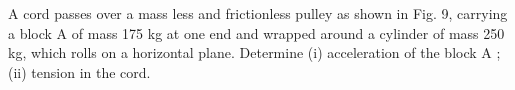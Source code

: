   \Or

\item A cord passes over a mass less and frictionless pulley as shown in Fig. 9, carrying a block A of
  mass 175 kg at one end and wrapped around a cylinder of mass 250 kg, which rolls on a horizontal
  plane. Determine (i) acceleration of the block A ; (ii) tension in the cord.

\ene


\ene


